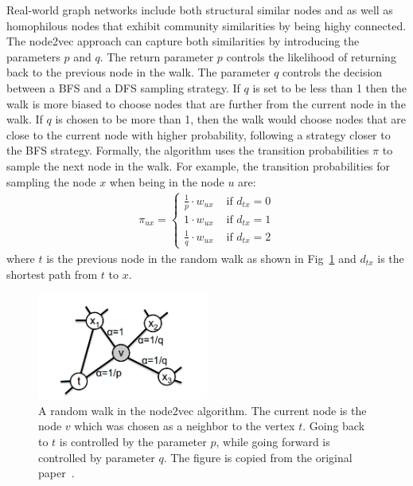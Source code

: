 Real-world graph networks include both structural similar nodes and as well as
homophilous nodes that exhibit community similarities by being highy connected.
The node2vec approach can capture both similarities by introducing the parameters
$p$ and $q$. The return parameter $p$ controls the likelihood of returning back
to the previous node in the walk. The parameter $q$ controls the decision
between a BFS and a DFS sampling strategy. If $q$ is set to be less than 1
then the walk is more biased to choose nodes that are further from the current
node in the walk. If $q$ is chosen to be more than 1, then the walk would choose
nodes that are close to the current node with higher probability, following a
strategy closer to the BFS strategy. Formally, the algorithm uses the transition
probabilities $\pi$ to sample the next node in the walk. For example, the
transition probabilities for sampling the node $x$ when being in the node $u$ are:
\begin{align}
\pi_{ux} = \begin{cases} \frac{1}{p}\cdot w_{ux} & \text{ if } d_{tx} = 0 \\
1\cdot w_{ux} & \text{ if } d_{tx} = 1 \\
\frac{1}{q}\cdot w_{ux} & \text{ if } d_{tx} = 2
\end{cases}
\end{align}
where $t$ is the previous node in the random walk as shown in
Fig~\ref{node2vec_png} and $d_{tx}$ is the shortest path from $t$ to $x$.
\begin{figure}
\begin{center}
\includegraphics[width=0.5\textwidth]{figures/node2vec.png}
\end{center}
\caption{A random walk in the node2vec algorithm. The current node is the node
$v$ which was chosen as a neighbor to the vertex $t$.
Going back to $t$ is controlled by the parameter $p$, while going forward is
controlled by parameter $q$. The figure is copied from the original
paper~\cite{grover2016node2vec}.}
\label{node2vec_png}
\end{figure}


